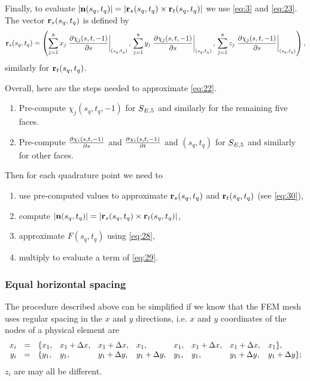 \documentclass[11pt]{article}
\begin{document}
Finally, to evaluate $|\mathbf{n}(s_{q}, t_{q})| = | \mathbf{r}_{s}(s_{q}, t_{q}) \times
\mathbf{r}_{t}(s_{q}, t_{q}) |$ we use \eqref{eq:3} and \eqref{eq:23}.
The vector $\mathbf{r}_{s}(s_{q}, t_{q})$ is defined by
\begin{equation}
\label{eq:30}
\mathbf{r}_{s}(s_{q},t_{q}) = \left(
  \sum_{j=1}^{8} x_{j} \left.\frac{\partial \chi_{j}(s, t, -1)}{\partial s}\right|_{(s_{q}, t_{q})},\,
  \sum_{j=1}^{8} y_{j} \left.\frac{\partial \chi_{j}(s, t, -1)}{\partial s}\right|_{(s_{q}, t_{q})},\,
  \sum_{j=1}^{8} z_{j} \left.\frac{\partial \chi_{j}(s, t, -1)}{\partial s}\right|_{(s_{q}, t_{q})} \right),
\end{equation}
similarly for $\mathbf{r}_{t}(s_{q}, t_{q})$.

Overall, here are the steps needed to approximate \eqref{eq:22}.

\begin{enumerate}
\item Pre-compute $\chi_{j}(s_{q}, t_{q}, -1)$ for $S_{E,5}$ and similarly
for the remaining five faces.
\item Pre-compute $\frac{\partial \chi_{i}(s, t, -1)}{\partial s}$ and
$\frac{\partial \chi_{i}(s, t, -1)}{\partial t}$ and $(s_{q}, t_{q})$ for $S_{E,5}$ and similarly for
other faces.
\end{enumerate}

Then for each quadrature point we need to

\begin{enumerate}
\item use pre-computed values to approximate $\mathbf{r}_{s}(s_{q},t_{q})$ and
$\mathbf{r}_{t}(s_{q},t_{q})$ (see \eqref{eq:30}),
\item compute $|\mathbf{n}(s_{q}, t_{q})| = | \mathbf{r}_{s}(s_{q}, t_{q}) \times \mathbf{r}_{t}(s_{q}, t_{q}) |$,
\item approximate $F(s_{q}, t_{q})$ using \eqref{eq:28},
\item multiply to evaluate a term of \eqref{eq:29}.
\end{enumerate}

\subsubsection{Equal horizontal spacing}
\label{sec-4-1-1}

The procedure described above can be simplified if we know that the
FEM mesh uses regular spacing in the $x$ and $y$ directions, i.e.
$x$ and $y$ coordinates of the nodes of a physical element are
\begin{equation}
  \label{eq:31}
  \begin{array}{rcllllllll}
    x_{i} &=& \{ x_{1}, &x_{1} + \Delta x, &x_{1} + \Delta x, &x_{1}, &x_{1}, &x_{1} + \Delta x, &x_{1} + \Delta x, &x_{1} \},\\
    y_{i} &=& \{ y_{1}, &y_{1}, &y_{1} + \Delta y, &y_{1} + \Delta y, &y_{1}, &y_{1}, &y_{1} + \Delta y, &y_{1} + \Delta y \};\\
  \end{array}
\end{equation}
$z_{i}$ are may all be different.
\end{document}
